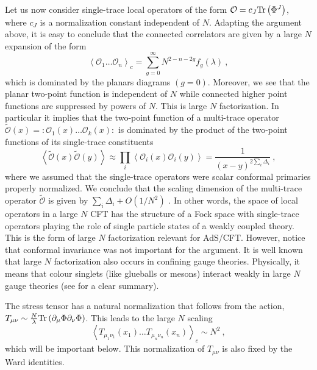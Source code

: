 \documentclass{ws-rv9x6}
\newcommand\be{\begin{equation}}
\newcommand\ee{\end{equation}}
\begin{document}
Let us now consider single-trace local operators of the form $\mathcal{O}=c_{J}{\rm Tr}\left(\Phi^{J}\right)$,
where $c_{J}$ is a normalization constant independent of $N$. Adapting
the argument above, it is easy to conclude that the connected correlators
are given by a large $N$ expansion of the form
\be
\left\langle \mathcal{O}_{1}\dots\mathcal{O}_{n}\right\rangle _{c}=\sum_{g=0}^{\infty}N^{2-n-2g}f_{g}(\lambda)\ ,
\ee
which is dominated by the planars diagrams $(g=0)$. Moreover, we
see that the planar two-point function is independent of $N$ while
connected higher point functions are suppressed by powers of $N$.
This is large $N$ factorization. In particular it implies that the
two-point function of a multi-trace operator $\tilde{\mathcal{O}}(x)=:\mathcal{O}_{1}(x)\dots\mathcal{O}_{k}(x):$
is dominated by the product of the two-point functions of its single-trace
constituents
\be
\left\langle \tilde{\mathcal{O}}(x)\tilde{\mathcal{O}}(y)\right\rangle \approx\prod_{i}\left\langle \mathcal{O}_{i}(x)\mathcal{O}_{i}(y)\right\rangle =\frac{1}{(x-y)^{2\sum_{i}\Delta_{i}}}\ ,
\ee
where we assumed that the single-trace operators were scalar conformal
primaries properly normalized. We conclude that the scaling dimension
of the multi-trace operator $\tilde{\mathcal{O}}$ is given by $\sum_{i}\Delta_{i}+O(1/N^{2})$
. In other words, the space of local operators in a large $N$ CFT
has the structure of a Fock space with single-trace operators playing
the role of single particle states of a weakly coupled theory.
This is the form of large $N$ factorization relevant for AdS/CFT. However, notice that conformal invariance was not important for the argument.
It is well known that large $N$ factorization also occurs in confining gauge theories. Physically, it means that colour singlets (like glueballs or mesons) interact weakly in large $N$ gauge theories (see \cite{Witten:1979kh} for a clear summary).


The stress tensor has a natural normalization that follows from the
action, $T_{\mu\nu}\sim\frac{N}{\lambda}{\rm Tr}\left(\partial_{\mu}\Phi\partial_{\nu}\Phi\right)$.
This leads to the large $N$ scaling
\begin{equation}
\left\langle T_{\mu_{1}\nu_{1}}(x_{1})\dots T_{\mu_{n}\nu_{n}}(x_{n})\right\rangle _{c}\sim N^{2}\ ,\label{eq:TTTTTlargeNscaling}
\end{equation}
which will be important below.
This normalization of $T_{\mu\nu}$ is also fixed by the Ward identities.
\end{document}
